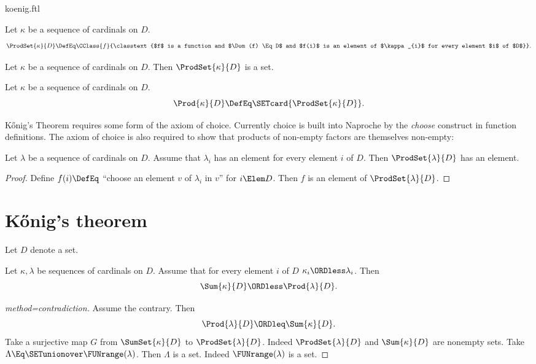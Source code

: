 \documentclass{stex}
\begin{document}
\begin{smodule}{koenig.ftl}
\begin{forthel}
  \begin{definition*}[for=ProdSet]
    Let $\kappa$ be a sequence of cardinals on $D$.
    \[ \ProdSet{\kappa}{D} \DefEq \CClass{f}{\classtext{$f$ is a function and $\Dom(f) \Eq D$ and $f(i)$ is an element of $\kappa_{i}$ for every element $i$ of $D$}}. \]
  \end{definition*}

  \begin{axiom*}
    Let $\kappa$ be a sequence of cardinals on $D$.
    Then $\ProdSet{\kappa}{D}$ is a set.
  \end{axiom*}

  \begin{definition*}[for=Prod]
    Let $\kappa$ be a sequence of cardinals on $D$.
    \[ \Prod{\kappa}{D} \DefEq \SETcard{ \ProdSet{\kappa}{D} }. \]
  \end{definition*}
\end{forthel}

Kőnig's Theorem requires some form of the axiom of choice.
Currently choice is built into Naproche by the \emph{choose} construct in
function definitions.
The axiom of choice is also required to show that products of non-empty factors
are themselves non-empty:

\begin{forthel}
  \begin{lemma*}[title=Choice]
    Let $\lambda$ be a sequence of cardinals on $D$.
    Assume that $\lambda_{i}$ has an element for every element $i$ of $D$.
    Then $\ProdSet{\lambda}{D}$ has an element.
  \end{lemma*}
  \begin{proof}
    Define $f(i) \DefEq$ ``choose an element $v$ of $\lambda_{i}$ in $v$'' for $i \Elem D$.
    Then $f$ is an element of $\ProdSet{\lambda}{D}$.
  \end{proof}
\end{forthel}


\section*{Kőnig's theorem}

\begin{forthel}
  Let $D$ denote a set.

  \begin{theorem*}[title=Kőnig,name=Koenig]
    Let $\kappa, \lambda$ be sequences of cardinals on $D$.
    Assume that for every element $i$ of $D$ $\kappa_{i} \ORDless \lambda_{i}$.
    Then \[ \Sum{\kappa}{D} \ORDless \Prod{\lambda}{D}. \]
  \end{theorem*}
  \begin{proof}[method=contradiction]
    Assume the contrary.
    Then \[ \Prod{\lambda}{D} \ORDleq \Sum{\kappa}{D}. \]
    Take a surjective map $G$ from $\SumSet{\kappa}{D}$ to $\ProdSet{\lambda}{D}$.
    Indeed $\ProdSet{\lambda}{D}$ and $\Sum{\kappa}{D}$ are nonempty sets.
    Take $\Lambda \Eq \SETunionover \FUNrange(\lambda)$.
    Then $\Lambda$ is a set.
    Indeed $\FUNrange(\lambda)$ is a set.


\end{proof}
\end{forthel}
\end{smodule}
\end{document}
